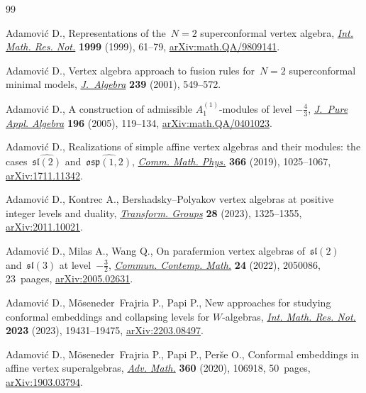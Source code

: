 \documentclass[pdftex]{sigma}
\numberwithin{equation}{section}
\begin{document}
\begin{thebibliography}{99}
\footnotesize\itemsep=0pt

Adamovi\'c D., Representations of the~{$N=2$} superconformal vertex algebra,
 \href{https://doi.org/10.1155/S1073792899000033}{\textit{Int. Math. Res. Not.}} \textbf{1999} (1999), 61--79,
 \href{http://arxiv.org/abs/math.QA/9809141}{arXiv:math.QA/9809141}.

Adamovi\'c D., Vertex algebra approach to fusion rules for~${N=2}$
 superconformal minimal models,
 \href{https://doi.org/10.1006/jabr.2000.8728}{\textit{J.~Algebra}}
 \textbf{239} (2001), 549--572.

Adamovi\'c D., A construction of admissible {$A^{(1)}_1$}-modules of level
 {$-\frac 43$},
 \href{https://doi.org/10.1016/j.jpaa.2004.08.007}{\textit{J.~Pure Appl.
 Algebra}} \textbf{196} (2005), 119--134,
 \href{http://arxiv.org/abs/math.QA/0401023}{arXiv:math.QA/0401023}.

Adamovi\'c D., Realizations of simple affine vertex algebras and their modules:
 the cases~{$\widehat{\mathfrak{sl}(2)}$}
 and~{$\widehat{\mathfrak{osp}(1,2)}$},
 \href{https://doi.org/10.1007/s00220-019-03328-4}{\textit{Comm. Math. Phys.}}
 \textbf{366} (2019), 1025--1067,
 \href{http://arxiv.org/abs/1711.11342}{arXiv:1711.11342}.

Adamovi\'c D., Kontrec A., Bershadsky--{P}olyakov vertex algebras at positive
 integer levels and duality,
 \href{https://doi.org/10.1007/s00031-022-09721-z}{\textit{Transform. Groups}}
 \textbf{28} (2023), 1325--1355,
 \href{http://arxiv.org/abs/2011.10021}{arXiv:2011.10021}.

Adamovi\'c D., Milas A., Wang Q., On parafermion vertex algebras
 of~{$\mathfrak{sl}(2)$} and~{$\mathfrak{sl}(3)$} at level~{$-\frac32$},
 \href{https://doi.org/10.1142/S0219199720500868}{\textit{Commun. Contemp.
 Math.}} \textbf{24} (2022), 2050086, 23~paages,
 \href{http://arxiv.org/abs/2005.02631}{arXiv:2005.02631}.

Adamovi\'c D., M\"oseneder~Frajria P., Papi P., New approaches for studying
 conformal embeddings and collapsing levels for {$W$}-algebras,
 \href{https://doi.org/10.1093/imrn/rnad138}{\textit{Int. Math. Res. Not.}} \textbf{2023} (2023), 19431--19475,
 \href{http://arxiv.org/abs/2203.08497}{arXiv:2203.08497}.

Adamovi\'c D., M\"oseneder~Frajria P., Papi P., Per\v{s}e O., Conformal
 embeddings in affine vertex superalgebras,
 \href{https://doi.org/10.1016/j.aim.2019.106918}{\textit{Adv. Math.}}
 \textbf{360} (2020), 106918, 50~pages,
 \href{http://arxiv.org/abs/1903.03794}{arXiv:1903.03794}.


\end{thebibliography}
\end{document}
